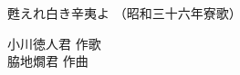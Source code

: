 \documentclass[10pt,b5j]{tarticle} %
\begin{document}
\begin{minipage}[c]{0.7\hsize} %
    \begin{center}
        {\LARGE
            甦えれ白き辛夷よ %
        }
        {\small 
            （昭和三十六年寮歌） %
        }
    \end{center}
\end{minipage}
\begin{minipage}[c]{0.3\hsize} %
    \begin{flushright} %
        小川徳人君 作歌\\脇地燗君 作曲 %
    \end{flushright}
\end{minipage}
\end{document}
